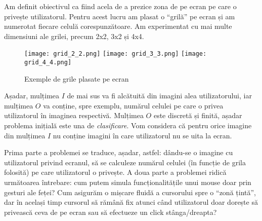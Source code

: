 Am definit obiectivul ca fiind acela de a prezice zona de pe ecran pe care o privește utilizatorul.
Pentru acest lucru am plasat o ``grilă'' pe ecran și am numerotat fiecare celulă corespunzătoare.
Am experimentat cu mai multe dimensiuni ale grilei, precum 2x2, 3x2 și 4x4.

\begin{figure}[H]
    \centering
    \texttt{[image: grid\_2\_2.png]}
    \texttt{[image: grid\_3\_3.png]}
    \texttt{[image: grid\_4\_4.png]}
    \caption{Exemple de grile plasate pe ecran}
    \label{grid-example}
\end{figure}

Așadar, mulțimea $I$ de mai sus va fi alcătuită din imagini alea utilizatorului, iar mulțimea $O$ va conține, spre exemplu, numărul celulei pe care o privea utilizatorul în imaginea respectivă.
Mulțimea $O$ este discretă și finită, așadar problema inițială este una de \emph{clasificare}.
Vom considera că pentru orice imagine din mulțimea $I$ nu conține imagini în care utilizatorul nu se uita la ecran.

Prima parte a problemei se traduce, așadar, astfel: dându-se o imagine cu utilizatorul privind ecranul, să se calculeze numărul celulei (în funcție de grila folosită) pe care utilizatorul o privește.
A doua parte a problemei ridică următoarea întrebare: cum putem simula funcționalitățile unui mouse doar prin gesturi ale feței?
Cum asigurăm o mișcare fluidă a cursorului spre o ``zonă țintă'', dar în același timp cursorul să rămână fix atunci când utilizatorul doar dorește să privească ceva de pe ecran sau să efectueze un click stânga/dreapta?





